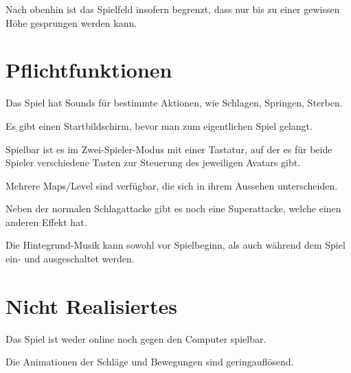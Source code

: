\documentclass[11pt]{article}
\newcommand{\paragraphspace}{0.3cm}
\begin{document}
    \noindent
    Nach obenhin ist das Spielfeld insofern begrenzt, dass nur bis zu einer gewissen H\"ohe gesprungen werden kann.
    \newpage
    \section{Pflichtfunktionen}\label{sec:muss}
    Das Spiel hat Sounds f\"ur bestimmte Aktionen, wie Schlagen, Springen, Sterben.
    \vspace{\paragraphspace}

    \noindent
    Es gibt einen Startbildschirm, bevor man zum eigentlichen Spiel gelangt.
    \vspace{\paragraphspace}

    \noindent
    Spielbar ist es im \glqq Zwei-Spieler-Modus\grqq{} mit einer Tastatur, auf der es f\"ur beide Spieler verschiedene
    Tasten zur Steuerung des jeweiligen Avatars gibt.\vspace{\paragraphspace}

    \noindent
    Mehrere Maps/Level sind verf\"ugbar, die sich in ihrem Aussehen unterscheiden.
    \vspace{\paragraphspace}

    \noindent
    Neben der normalen Schlagattacke gibt es noch eine Superattacke, welche einen anderen Effekt hat.
    \vspace{\paragraphspace}

    \noindent
    Die Hintegrund-Musik kann sowohl vor Spielbeginn, als auch w\"ahrend dem Spiel ein- und ausgeschaltet werden.

    \section{Nicht Realisiertes}\label{sec:kann-nicht}

    Das Spiel ist weder online noch gegen den Computer spielbar.
    \vspace{\paragraphspace}

    \noindent
    Die Animationen der Schl\"age und Bewegungen sind geringaufl\"osend.
\end{document}
